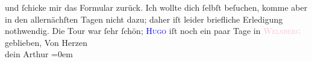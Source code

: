                und ſchicke mir das Formular zurück.\pend
           \pstart
           Ich wollte dich ſelbſt beſuchen, komme aber in den allernächſten Tagen nicht dazu;
               daher iſt leider briefliche Erledigung nothwendig.\pend
           \pstart
           Die Tour war ſehr ſchön; \textsc{\textcolor{blue}{Hugo}{}\ledrightnote{\textcolor{blue}{Hugo von Hofmannsthal}}} iſt noch ein paar Tage in \textsc{\textcolor{pink}{Welsberg}{}\ledrightnote{\textcolor{pink}{Welsberg-Taisten}}} geblieben,\pend
           \pstart
           Von Herzen{\\[\baselineskip]}dein \spacefill\mbox{Arthur}\pend
           \leftskip=0em{}\endnumbering{}  
      